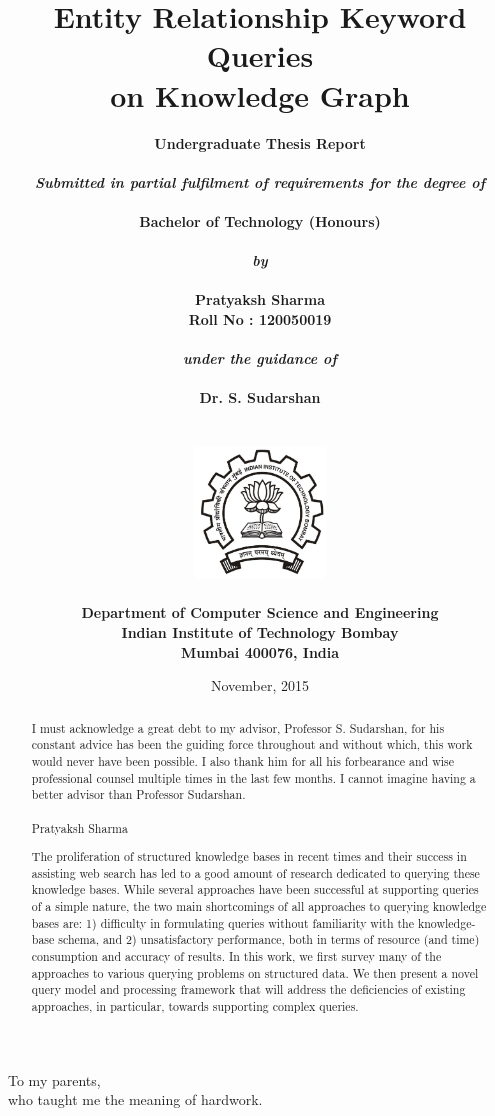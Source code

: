 \documentclass[a4paper, twoside, 12pt]{report}
\title{\textbf{Entity Relationship Keyword Queries \\ on Knowledge Graph}}
\author{
		\bf{Undergraduate Thesis Report}\\
        \\
        \emph{Submitted in partial fulfilment of requirements for the degree of}\\
        \\
        \bf{Bachelor of Technology (Honours)}\\
        \\
        \emph{by}\\
        \\
		\bf{Pratyaksh Sharma}\\
        \bf{Roll No : 120050019}\\
        \\
        \emph{under the guidance of}\\
        \\
		\bf{Dr. S. Sudarshan}\\
        \\\\
        \includegraphics[height=3.5cm]{iitb_logo.jpg}\\
        \\
		\bf{Department of Computer Science and Engineering}\\
        \bf{Indian Institute of Technology Bombay}\\
        \bf{Mumbai 400076, India}\\
}
\date{November, 2015}
\makeatletter
\newenvironment{dedication}
  {\clearpage           %
   \thispagestyle{empty}%
   \vspace*{\stretch{1}}%
   \itshape             %
   \center          %
  }
  {\par %
   \vspace{\stretch{3}} %
   \clearpage           %
}
\newcommand\frontmatter{%
    \cleardoublepage
  \pagenumbering{roman}}
\newcommand\mainmatter{%
    \cleardoublepage
  \pagenumbering{arabic}}
\makeatother
\begin{document}
\frontmatter

\maketitle

\linespread{1.2}

\setlength{\parindent}{2em}
\setlength{\parskip}{0.5em}


\begin{dedication}
To my parents,\\ who taught me the meaning of hardwork.
\end{dedication}


\renewcommand{\abstractname}{Acknowledgement}

\begin{abstract}

  I must acknowledge a great debt to my advisor, Professor S. Sudarshan, for his constant advice has been the guiding force throughout and without which, this work would never have been possible. I also thank him for all his forbearance and wise professional counsel multiple times in the last few months. I cannot imagine having a better advisor than Professor Sudarshan.
  \\ \\
Pratyaksh Sharma
\end{abstract}


\renewcommand{\abstractname}{Abstract}
\begin{abstract}
  The proliferation of structured knowledge bases in recent times and their success in assisting web search has led to a good amount of research dedicated to querying these knowledge bases. While several approaches have been successful at supporting queries of a simple nature, the two main shortcomings of all approaches to querying knowledge bases are: 1) difficulty in formulating queries without familiarity with the knowledge-base schema, and 2) unsatisfactory performance, both in terms of resource (and time) consumption and accuracy of results. In this work, we first survey many of the approaches to various querying problems on structured data. We then present a novel query model and processing framework that will address the deficiencies of existing approaches, in particular, towards supporting complex queries.

\end{abstract}


\tableofcontents

\mainmatter


\pagebreak














\end{document}
